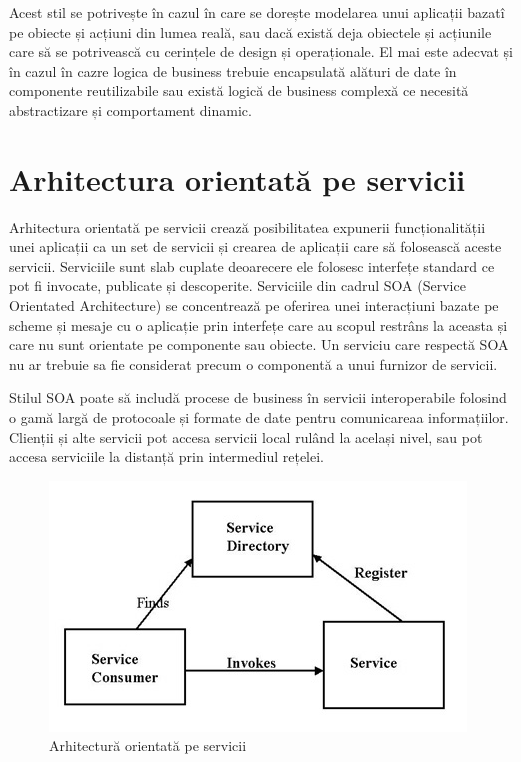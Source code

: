 \documentclass[12pt, a4paper, oneside, romanian]{teza-upb}
\begin{document}
Acest stil se potrivește în cazul în care se dorește modelarea unui aplicații bazatî pe obiecte și acțiuni din lumea reală, sau dacă există deja obiectele și acțiunile care să se potrivească cu cerințele de design și operaționale.
El mai este adecvat și în cazul în cazre logica de business trebuie encapsulată alături de date în componente reutilizabile sau există logică de business complexă ce necesită abstractizare și comportament dinamic.

\section{Arhitectura orientată pe servicii}
Arhitectura orientată pe servicii crează posibilitatea expunerii funcționalității unei aplicații ca un set de servicii și crearea de aplicații care să folosească aceste servicii. Serviciile sunt slab cuplate deoarecere ele folosesc interfețe standard ce pot fi invocate, publicate și descoperite. Serviciile din cadrul SOA (Service Orientated Architecture) se concentrează pe oferirea unei interacțiuni bazate pe scheme și mesaje cu o aplicație prin interfețe care au scopul restrâns la aceasta și care nu sunt orientate pe componente sau obiecte. Un serviciu care respectă SOA nu ar trebuie sa fie considerat precum o componentă a unui furnizor de servicii. 

Stilul SOA poate să includă procese de business în servicii interoperabile folosind o gamă largă de protocoale și formate de date pentru comunicareaa informațiilor. Clienții și alte servicii pot accesa servicii local rulând la același nivel, sau pot accesa serviciile la distanță prin intermediul rețelei.

\begin{figure}[ht]
\centering
\includegraphics[scale=0.7]{img/soa.png}
\caption{Arhitectură orientată pe servicii}
\label{fig:arhi_componente}
\end{figure}
\end{document}
